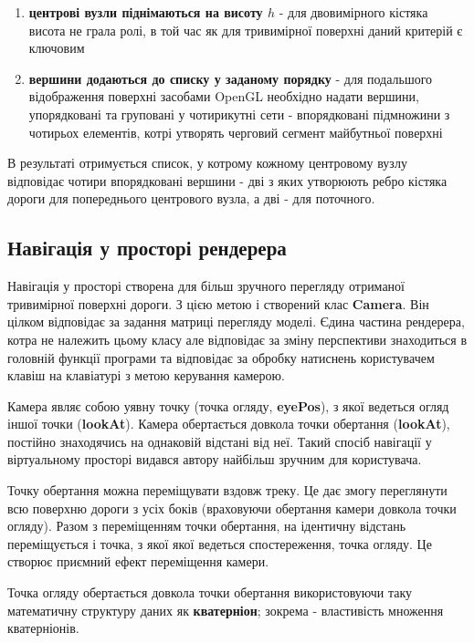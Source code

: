 \documentclass[simple,a4paper,14pt,ukrainian,utf8]{eskdtext}
\begin{document}
		\begin{enumerate}
			\item \textbf{центрові вузли піднімаються на висоту $h$} - для двовимірного кістяка висота не грала ролі, в той час як для тривимірної поверхні даний критерій є ключовим
			\item \textbf{вершини додаються до списку у заданому порядку} - для подальшого відображення поверхні засобами OpenGL необхідно надати вершини, упорядковані та груповані у чотирикутні сети - впорядковані підмножини з чотирьох елементів, котрі утворять черговий сегмент майбутньої поверхні
		\end{enumerate}
		
		В результаті отримується список, у котрому кожному центровому вузлу відповідає чотири впорядковані вершини - дві з яких утворюють ребро кістяка дороги для попереднього центрового вузла, а дві - для поточного.
	
	\subsection{Навігація у просторі рендерера}
	
		Навігація у просторі створена для більш зручного перегляду отриманої тривимірної поверхні дороги. З цією метою і створений клас \textbf{Camera}. Він цілком відповідає за задання матриці перегляду моделі. Єдина частина рендерера, котра не належить цьому класу але відповідає за зміну перспективи знаходиться в головній функції програми та відповідає за обробку натиснень користувачем клавіш на клавіатурі з метою керування камерою.
		
		Камера являє собою уявну точку (точка огляду, \textbf{eyePos}), з якої ведеться огляд іншої точки (\textbf{lookAt}). Камера обертається довкола точки обертання (\textbf{lookAt}), постійно знаходячись на однаковій відстані від неї. Такий спосіб навігації у віртуальному просторі видався автору найбільш зручним для користувача.
		
		Точку обертання можна переміщувати вздовж треку. Це дає змогу переглянути всю поверхню дороги з усіх боків (враховуючи обертання камери довкола точки огляду). Разом з переміщенням точки обертання, на ідентичну відстань переміщується і точка, з якої якої ведеться спостереження, точка огляду. Це створює приємний ефект переміщення камери.
		
		Точка огляду обертається довкола точки обертання використовуючи таку математичну структуру даних як \textbf{кватерніон}; зокрема - властивість множення кватерніонів.
		
\end{document}
